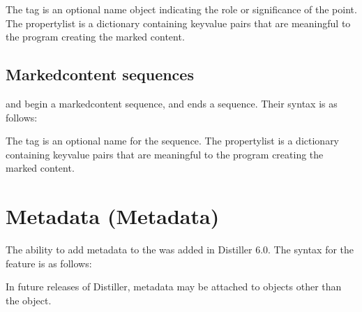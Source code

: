 \documentclass[letterpaper,12pt,english,openany,oneside]{sphinxmanual}
\begin{document}
The tag is an optional name object indicating the role or significance of the point. The property\sphinxhyphen{}list is a dictionary containing key\sphinxhyphen{}value pairs that are meaningful to the program creating the marked content.


\subsection{Marked\sphinxhyphen{}content sequences}
\label{\detokenize{pdfmark_Basic:marked-content-sequences}}
 and  begin a marked\sphinxhyphen{}content sequence, and  ends a sequence. Their syntax is as follows:

\begin{sphinxVerbatim}[commandchars=\\\{\}]
 \PYG{p}{[}
         
    \PYG{p}{[}

         
    \PYG{p}{[}  
\end{sphinxVerbatim}

The tag is an optional name for the sequence. The property\sphinxhyphen{}list is a dictionary containing key\sphinxhyphen{}value pairs that are meaningful to the program creating the marked content.


\section{Metadata (Metadata)}
\label{\detokenize{pdfmark_Basic:metadata-metadata}}
The ability to add metadata to the  was added in Distiller 6.0. The syntax for the  feature is as follows:

\begin{sphinxVerbatim}[commandchars=\\\{\}]
 \PYG{p}{[}    
  
\end{sphinxVerbatim}

In future releases of Distiller, metadata may be attached to objects other than the  object.
\end{document}
